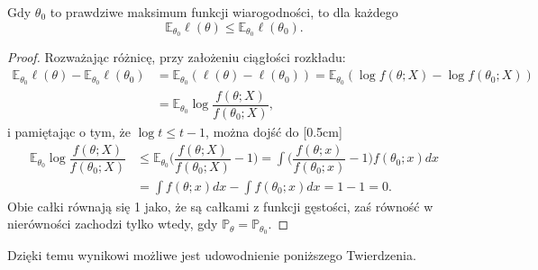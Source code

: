\begin{lemma}\label{l:pierwszy}
Gdy $\theta_0$ to prawdziwe maksimum funkcji wiarogodności, to dla każdego \text{$\theta \in \Theta$}
$$\mathbb{E}_{\theta_0}\ell(\theta) \leq \mathbb{E}_{\theta_0}\ell(\theta_0).$$
\end{lemma}

\begin{proof}
Rozważając różnicę, przy założeniu ciągłości rozkładu:
\begin{equation*}
\begin{split}
\mathbb{E}_{\theta_0}\ell(\theta) - \mathbb{E}_{\theta_0}\ell(\theta_0) & = \mathbb{E}_{\theta_0}(\ell(\theta) - \ell(\theta_0) ) = \mathbb{E}_{\theta_0}(\log f(\theta; X) - \log f(\theta_0; X)) \\
 & = \mathbb{E}_{\theta_0}\log\dfrac{f(\theta; X)}{f(\theta_0; X)},
\end{split}
\end{equation*}
i pamiętając o tym, że $\log t \leq t - 1$, można dojść do
[0.5cm]
\begin{equation*}
\begin{split}
\mathbb{E}_{\theta_0}\log\dfrac{f(\theta; X)}{f(\theta_0; X)} & \leq \mathbb{E}_{\theta_0}\Big(\dfrac{f(\theta; X)}{f(\theta_0; X)} - 1 \Big) = \int \Big(\dfrac{f(\theta; x)}{f(\theta_0; x)} - 1 \Big) f(\theta_0;x) dx \\ 
& = \int f(\theta;x)dx - \int f(\theta_0;x)dx = 1-1 =0.
\end{split}
\end{equation*}
Obie całki równają się 1 jako, że są całkami z funkcji gęstości, zaś równość w nierówności zachodzi tylko wtedy, gdy  $\mathbb{P}_{\theta}=\mathbb{P}_{\theta_0}$.
\end{proof}

Dzięki temu wynikowi możliwe jest udowodnienie poniższego Twierdzenia.

